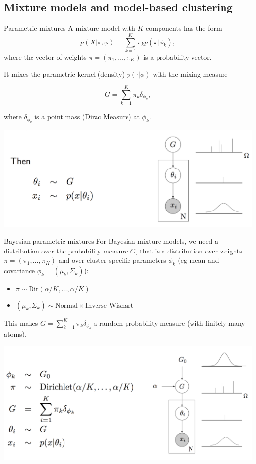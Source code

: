 \subsection[Mixture models]{Mixture models and model-based clustering}

\begin{frame}{Parametric mixtures}
 A mixture model with $K$ components has the form
 $$p(X|\pi,\phi) = \sum_{k=1}^K \pi_k p(x|\phi_k),$$
where the vector of weights $\pi = (\pi_1,\ldots,\pi_K)$ is a probability vector.

It mixes the parametric kernel (density) $p(\cdot|\phi)$ with the mixing measure
	
$$G = \sum_{k=1}^K \pi_k \delta_{\phi_k},$$
	
where $\delta_{\phi_k}$ is a point mass (Dirac Measure) at ${\phi_k}$.
	
\begin{center}
		\includegraphics[width=.8\textwidth]{figures_julyan/mixtures/plate_mixture}
\end{center}
\end{frame}



\begin{frame}{Bayesian parametric mixtures}
	 For \alert{Bayesian}   mixture models, we need a distribution over the probability measure $G$, that is a distribution over weights $\pi = (\pi_1,\ldots,\pi_K)$ and over cluster-specific parameters $\phi_k$ (eg mean and covariance  $\phi_k = (\mu_k,\Sigma_k)$):

\begin{itemize}
	\item $\pi\sim \text{Dir}(\alpha/K, \ldots,\alpha/K)$
	\item $(\mu_k,\Sigma_k)\sim \text{Normal}\times\text{Inverse-Wishart}$
\end{itemize}
This makes $G = \sum_{k=1}^K \pi_k \delta_{\phi_k}$ a random probability measure (with finitely many atoms).

\begin{center}
		\includegraphics[width=.8\textwidth]{figures_julyan/mixtures/plate_bayes_mixture}
\end{center}
\end{frame}

